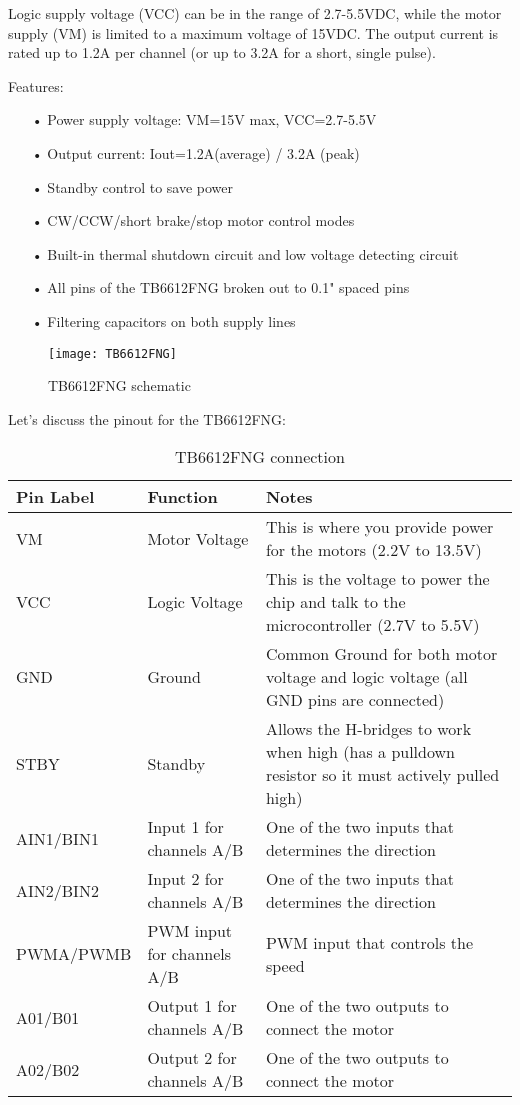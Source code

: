 \documentclass[
12pt, %
a4paper, %
oneside, %
headinclude,footinclude, %
BCOR5mm, %
]{scrartcl}
\begin{document}
Logic supply voltage (VCC) can be in the range of 2.7-5.5VDC, while the motor supply (VM) is limited to a maximum voltage of 15VDC. The output current is rated up to 1.2A per channel (or up to 3.2A for a short, single pulse).

Features:
\begin{itemize}
\item[•] Power supply voltage: VM=15V max, VCC=2.7-5.5V
\item[•] Output current: Iout=1.2A(average) / 3.2A (peak)
\item[•] Standby control to save power
\item[•] CW/CCW/short brake/stop motor control modes
\item[•] Built-in thermal shutdown circuit and low voltage detecting circuit
\item[•] All pins of the TB6612FNG broken out to 0.1" spaced pins
\item[•] Filtering capacitors on both supply lines
\end{itemize}

\begin{figure}[H]
\centering
\texttt{[image: TB6612FNG]} 
\caption[TB6612FNG schematic]{TB6612FNG schematic}
\label{fig:TB6612FNG}
\end{figure}
Let’s discuss the pinout for the TB6612FNG:


\newcolumntype{b}{X}

\begin{table}[H]
\caption{TB6612FNG connection}
\centering
\begin{adjustwidth}{-1cm}{}
\resizebox{16cm}{!} {%
\begin{tabularx}{18cm}{smb}
\toprule
Pin Label & Function & Notes \\
\midrule
VM & Motor Voltage  & This is where you provide power for the motors (2.2V to 13.5V)\\
VCC & Logic Voltage & This is the voltage to power the chip and talk to the microcontroller (2.7V to 5.5V)\\
GND & Ground  & Common Ground for both motor voltage and logic voltage (all GND pins are connected)\\
STBY & Standby & Allows the H-bridges to work when high (has a pulldown resistor so it must actively pulled high)\\
AIN1/BIN1 & Input 1 for channels A/B   & One of the two inputs that determines the direction\\
AIN2/BIN2 & Input 2 for channels A/B   & One of the two inputs that determines the direction\\
PWMA/PWMB & PWM input for channels A/B & PWM input that controls the speed\\
A01/B01 & Output 1 for channels A/B  & One of the two outputs to connect the motor\\
A02/B02 & Output 2 for channels A/B  & One of the two outputs to connect the motor\\
\bottomrule
\end{tabularx} } 
\end{adjustwidth}
\label{tab:label}
\end{table}
\end{document}
